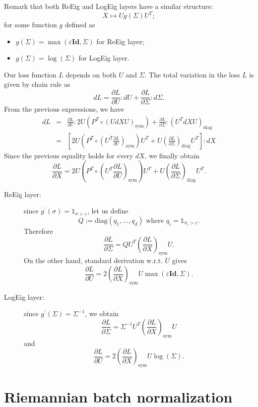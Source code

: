\documentclass[10pt,a4paper]{book}
\theoremstyle{definition}
\theoremstyle{plain}
\theoremstyle{remark}
\newcommand{\Id}{\mathrm{\textbf{Id}}}
\begin{document}
Remark that both ReEig and LogEig layers have a similar structure:
$$X \mapsto Ug(\Sigma)U^T;$$
for some function $g$ defined as
\begin{itemize}
    \item $g(\Sigma)=\max(\varepsilon \Id,\Sigma)$ for ReEig layer;
    \item $g(\Sigma)=\log(\Sigma)$ for LogEig layer.
\end{itemize}
Our loss function $L$ depends on both $U$ and $\Sigma$. 
The total variation in the loss $L$ is given by chain rule as
$$dL=\frac{\partial L}{\partial U}:dU+\frac{\partial L}{\partial \Sigma}:d\Sigma.$$
From the previous expressions, we have
\begin{eqnarray*}
    dL&=&\frac{\partial L}{\partial U}:2U(P^T \circ (U dX U)_{\text{sym}})+\frac{\partial L}{\partial \Sigma}:(U^T dX U)_{\text{diag}}\\
    &=&\left [2U(P^T \circ (U^T \frac{\partial L}{\partial U})_{\text{sym}})U^T+U\left (\frac{\partial L}{\partial \Sigma} \right )_{\text{diag}} U^T\right ]: dX
\end{eqnarray*}
Since the previous equality holds for every $dX$, we finally obtain
$$\frac{\partial L}{\partial X}=2U(P^T \circ (U^T \frac{\partial L}{\partial U})_{\text{sym}})U^T+U\left (\frac{\partial L}{\partial \Sigma} \right )_{\text{diag}}U^T.$$

\begin{description}
    \item[ReEig layer:]  since $g^{\prime}(\sigma)=\mathds{1}_{\sigma>\varepsilon}$, let us define
     $$Q:=\text{diag}(q_1,\dots,q_d) \text{ where } q_i=\mathds{1}_{\sigma_i>\varepsilon}.$$
    Therefore
    $$\frac{\partial L}{\partial \Sigma}=QU^T \left ( \frac{\partial L}{\partial X} \right )_{\text{sym}} U.$$
    On the other hand, standard derivation w.r.t. $U$ gives 
    $$
    \frac{\partial L}{\partial U}=2\left ( \frac{\partial L}{\partial X} \right )_{\text{sym}} U \max(\varepsilon \Id, \Sigma).
    $$
    \item[LogEig layer:] since $g^{\prime}(\Sigma)=\Sigma^{-1}$, we obtain
    $$
    \frac{\partial L}{\partial \Sigma}=\Sigma^{-1}U^T \left ( \frac{\partial L}{\partial X} \right )_{\text{sym}} U
    $$
    and
    $$
    \frac{\partial L}{\partial U}=2\left ( \frac{\partial L}{\partial X} \right )_{\text{sym}} U \log(\Sigma).
    $$
\end{description}

\section{Riemannian batch normalization}
\end{document}
